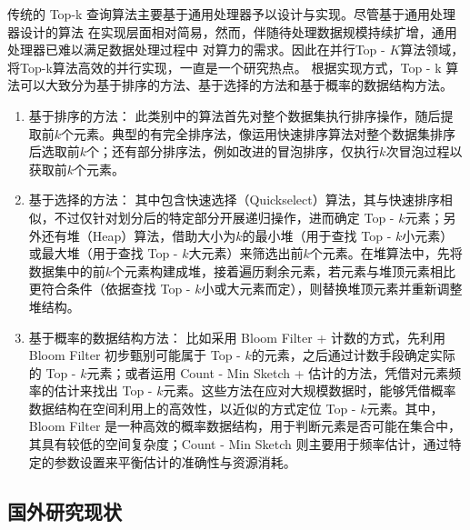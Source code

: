 传统的 Top-k 查询算法主要基于通用处理器予以设计与实现。尽管基于通用处理器设计的算法
在实现层面相对简易，然而，伴随待处理数据规模持续扩增，通用处理器已难以满足数据处理过程中
对算力的需求。因此在并行Top - $K$算法领域，将Top-k算法高效的并行实现，一直是一个研究热点。
根据实现方式，Top - k 算法可以大致分为基于排序的方法、基于选择的方法和基于概率的数据结构方法。
\begin{enumerate}
\item{基于排序的方法}：
此类别中的算法首先对整个数据集执行排序操作，随后提取前\(k\)个元素。典型的有完全排序法，像运用快速排序算法对整个数据集排序后选取前\(k\)个；还有部分排序法，例如改进的冒泡排序，仅执行\(k\)次冒泡过程以获取前\(k\)个元素。

\item{基于选择的方法}：
其中包含快速选择（Quickselect）算法，其与快速排序相似，不过仅针对划分后的特定部分开展递归操作，进而确定 Top - \(k\)元素；另外还有堆（Heap）算法，借助大小为\(k\)的最小堆（用于查找 Top - \(k\)小元素）或最大堆（用于查找 Top - \(k\)大元素）来筛选出前\(k\)个元素。在堆算法中，先将数据集中的前\(k\)个元素构建成堆，接着遍历剩余元素，若元素与堆顶元素相比更符合条件（依据查找 Top - \(k\)小或大元素而定），则替换堆顶元素并重新调整堆结构。

\item{基于概率的数据结构方法}：
比如采用 Bloom Filter + 计数的方式，先利用 Bloom Filter 初步甄别可能属于 Top - \(k\)的元素，之后通过计数手段确定实际的 Top - \(k\)元素；或者运用 Count - Min Sketch + 估计的方法，凭借对元素频率的估计来找出 Top - \(k\)元素。这些方法在应对大规模数据时，能够凭借概率数据结构在空间利用上的高效性，以近似的方式定位 Top - \(k\)元素。其中，Bloom Filter 是一种高效的概率数据结构，用于判断元素是否可能在集合中，其具有较低的空间复杂度；Count - Min Sketch 则主要用于频率估计，通过特定的参数设置来平衡估计的准确性与资源消耗。 
\end{enumerate}

\subsection{国外研究现状}


